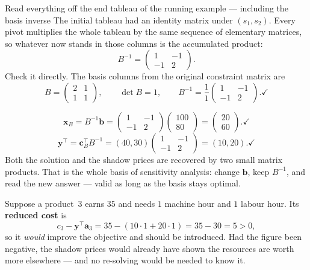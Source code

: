 \begin{worked}{Read everything off the end tableau of the running example --- including the basis inverse}
The initial tableau had an identity matrix under $(s_{1},s_{2})$. Every
pivot multiplies the whole tableau by the same sequence of elementary
matrices, so whatever now stands in those columns is the accumulated
product:
\[
  B^{-1}=\begin{pmatrix}1&-1\\-1&2\end{pmatrix}.
\]
Check it directly. The basis columns from the original constraint matrix are
\[
  B=\begin{pmatrix}2&1\\1&1\end{pmatrix},
  \qquad
  \det B=1,
  \qquad
  B^{-1}=\frac{1}{1}\begin{pmatrix}1&-1\\-1&2\end{pmatrix}. \checkmark
\]

\[
  \mathbf x_{B}=B^{-1}\mathbf b
  =\begin{pmatrix}1&-1\\-1&2\end{pmatrix}\begin{pmatrix}100\\80\end{pmatrix}
  =\begin{pmatrix}20\\60\end{pmatrix}. \checkmark
\]
\[
  \mathbf y^{\!\top}=\mathbf c_{B}^{\!\top}B^{-1}
  =(40,30)\begin{pmatrix}1&-1\\-1&2\end{pmatrix}
  =(10,20). \checkmark
\]
Both the solution and the shadow prices are recovered by two small matrix
products. That is the whole basis of sensitivity analysis: change
$\mathbf b$, keep $B^{-1}$, and read the new answer --- valid as long as the
basis stays optimal.

Suppose a product~3 earns $35$ and needs $1$ machine hour and $1$ labour
hour. Its \textbf{reduced cost} is
\[
  c_{3}-\mathbf y^{\!\top}\mathbf a_{3}=35-(10\cdot1+20\cdot1)=35-30=5>0 ,
\]
so it \emph{would} improve the objective and should be introduced. Had the
figure been negative, the shadow prices would already have shown the
resources are worth more elsewhere --- and no re-solving would be needed to
know it.
\end{worked}

